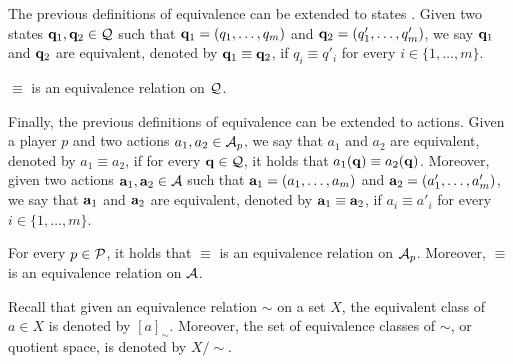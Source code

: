 \documentclass{article}
\begin{document}

The previous definitions of equivalence can be extended to states . Given two states $\mathbf{q}_1, \mathbf{q}_2 \in \mathcal{Q}$ such that $\mathbf{q}_1 = (q_1, \ldots, q_m)$ and $\mathbf{q}_2 = (q'_1, \ldots, q'_m)$, we say $\mathbf{q}_1$ and $\mathbf{q}_2$ are equivalent, denoted by $\mathbf{q}_1 \equiv \mathbf{q}_2$, if $q_i \equiv q'_i$ for every $i \in \{1, \ldots, m\}$. 

\begin{mylem}
$\equiv$ is an equivalence relation on $\mathcal{Q}$.
\end{mylem}


Finally, the previous definitions of equivalence can be extended to actions.
Given a player $p$ and two actions $a_1, a_2 \in \mathcal{A}_p$, we say that $a_1$ and $a_2$ are equivalent, denoted by $a_1 \equiv a_2$, if for every $\mathbf{q} \in \mathcal{Q}$, it holds that $a_1(\mathbf{q}) \equiv a_2(\mathbf{q})$. Moreover, given two actions $\mathbf{a}_1, \mathbf{a}_2 \in \mathcal{A}$ such that $\mathbf{a}_1 = (a_1, \ldots, a_m)$ and $\mathbf{a}_2 = (a'_1, \ldots, a'_m)$, we say that $\mathbf{a}_1$ and $\mathbf{a}_2$ are equivalent, denoted by $\mathbf{a}_1 \equiv \mathbf{a}_2$, if $a_i \equiv a'_i$ for every $i \in \{1, \ldots, m\}$.
\begin{mylem}
For every $p \in \mathcal{P}$, it holds that $\equiv$ is an equivalence relation on $\mathcal{A}_p$. Moreover, $\equiv$ is an equivalence relation on $\mathcal{A}$. 
\end{mylem}




Recall that given an equivalence relation $\sim$ on a set $X$, the equivalent class of $a \in X$ is denoted by $[a]_\sim$. Moreover, the set of equivalence classes of $\sim$, or quotient space, is denoted by $X/\!\!\sim$. 
\end{document}
